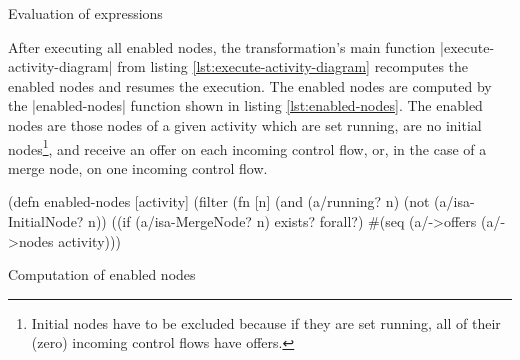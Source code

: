\documentclass[submission]{eptcs}
\newcommand{\code}{\clojureinline}
\begin{document}
\begin{listing}[h!tb]
\caption{Evaluation of expressions}
\label{lst:eval-exp}
\end{listing}

After executing all enabled nodes, the transformation's main function
\code|execute-activity-diagram| from listing
\vref{lst:execute-activity-diagram} recomputes the enabled nodes and resumes
the execution.  The enabled nodes are computed by the \code|enabled-nodes|
function shown in listing \vref{lst:enabled-nodes}.  The enabled nodes are
those nodes of a given activity which are set running, are no initial
nodes\footnote{Initial nodes have to be excluded because if they are set
  running, all of their (zero) incoming control flows have offers.}, and
receive an offer on each incoming control flow, or, in the case of a merge
node, on one incoming control flow.

\begin{listing}[h!tb]
\begin{clojurecode}
(defn enabled-nodes [activity]
  (filter (fn [n]
            (and (a/running? n)
                 (not (a/isa-InitialNode? n))
                 ((if (a/isa-MergeNode? n) exists? forall?)
                  #(seq (a/->offers %
          (a/->nodes activity)))
\end{clojurecode}
\caption{Computation of enabled nodes}
\label{lst:enabled-nodes}
\end{listing}
\end{document}
